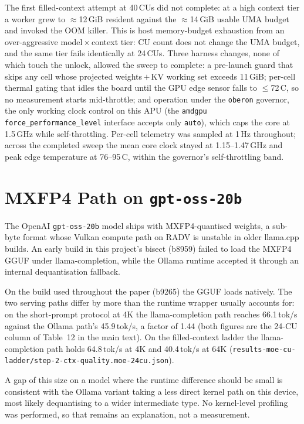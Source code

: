 \documentclass[11pt,a4paper]{article}
\begin{document}
The first filled-context attempt at 40\,CUs did not complete: at a
high context tier a worker grew to $\approx$12\,GiB resident against
the $\approx$14\,GiB usable UMA budget and invoked the OOM killer.
This is host memory-budget exhaustion from an over-aggressive
model\,$\times$\,context tier: CU count does not change the UMA
budget, and the same tier fails identically at 24\,CUs.  Three harness
changes, none of which touch the unlock, allowed the sweep to
complete: a pre-launch guard that skips any cell whose projected
weights\,$+$\,KV working set exceeds 11\,GiB; per-cell thermal gating
that idles the board until the GPU edge sensor falls to
$\leq$72\,\textdegree C, so no measurement starts mid-throttle; and
operation under the \texttt{oberon} governor, the only working clock
control on this APU (the \texttt{amdgpu}
\texttt{force\_performance\_level} interface accepts only
\texttt{auto}), which caps the core at 1.5\,GHz while self-throttling.
Per-cell telemetry was sampled at 1\,Hz throughout; across the
completed sweep the mean core clock stayed at 1.15--1.47\,GHz and peak
edge temperature at 76--95\,\textdegree C, within the governor's
self-throttling band.

\section{MXFP4 Path on \texttt{gpt-oss-20b}}

The OpenAI \texttt{gpt-oss-20b} model ships with MXFP4-quantised
weights, a sub-byte format whose Vulkan compute path on RADV is
unstable in older llama.cpp builds.  An early build in this project's
bisect (b8959) failed to load the MXFP4 GGUF under llama-completion,
while the Ollama runtime accepted it through an internal dequantisation
fallback.

On the build used throughout the paper (b9265) the GGUF loads natively.
The two serving paths differ by more than the runtime wrapper usually
accounts for: on the short-prompt protocol at 4K the llama-completion
path reaches 66.1\,tok/s against the Ollama path's 45.9\,tok/s, a
factor of 1.44 (both figures are the 24-CU column of Table~12 in the
main text).  On the filled-context ladder the llama-completion path
holds 64.8\,tok/s at 4K and 40.4\,tok/s at 64K
(\texttt{results-moe-cu-ladder/step-2-ctx-quality.moe-24cu.json}).

A gap of this size on a model where the runtime difference should be
small is consistent with the Ollama variant taking a less direct kernel
path on this device, most likely dequantising to a wider intermediate
type.  No kernel-level profiling was performed, so that remains an
explanation, not a measurement.
\end{document}
